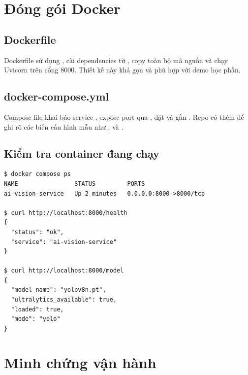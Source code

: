 \section{Đóng gói Docker}

\subsection{Dockerfile}

Dockerfile sử dụng , cài dependencies từ , copy toàn bộ mã nguồn và chạy Uvicorn trên cổng 8000. Thiết kế này khá gọn và phù hợp với demo học phần.

\subsection{docker-compose.yml}

Compose file khai báo service , expose port qua , đặt  và gắn . Repo có thêm  để ghi rõ các biến cấu hình mẫu như ,  và .

\subsection{Kiểm tra container đang chạy}

\begin{verbatim}
$ docker compose ps
NAME                STATUS         PORTS
ai-vision-service   Up 2 minutes   0.0.0.0:8000->8000/tcp

$ curl http://localhost:8000/health
{
  "status": "ok",
  "service": "ai-vision-service"
}

$ curl http://localhost:8000/model
{
  "model_name": "yolov8n.pt",
  "ultralytics_available": true,
  "loaded": true,
  "mode": "yolo"
}
\end{verbatim}

\section{Minh chứng vận hành}

